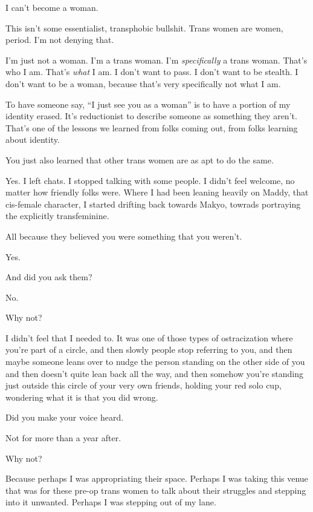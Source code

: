 \begin{paracol}{2}
\begin{leftcolumn}
I can't become a woman.

This isn't some essentialist, transphobic bullshit. Trans women are women, period. I'm not denying that.

I'm just not a woman. I'm a trans woman. I'm \emph{specifically} a trans woman. That's who I am. That's \emph{what} I am. I don't want to pass. I don't want to be stealth. I don't want to be a woman, because that's very specifically not what I am.

To have someone say, ``I just see you as a woman'' is to have a portion of my identity erased. It's reductionist to describe someone as something they aren't. That's one of the lessons we learned from folks coming out, from folks learning about identity.

\begin{ally}
You just also learned that other trans women are as apt to do the same.
\end{ally}
Yes. I left chats. I stopped talking with some people. I didn't feel welcome, no matter how friendly folks were. Where I had been leaning heavily on Maddy, that cis-female character, I started drifting back towards Makyo, towrads portraying the explicitly transfeminine.

\begin{ally}
All because they believed you were something that you weren't.
\end{ally}
Yes.

\begin{ally}
And did you ask them?
\end{ally}
No.

\begin{ally}
Why not?
\end{ally}
I didn't feel that I needed to. It was one of those types of ostracization where you're part of a circle, and then slowly people stop referring to you, and then maybe someone leans over to nudge the person standing on the other side of you and then doesn't quite lean back all the way, and then somehow you're standing just outside this circle of your very own friends, holding your red solo cup, wondering what it is that you did wrong.

\begin{ally}
Did you make your voice heard.
\end{ally}
Not for more than a year after.

\begin{ally}
Why not?
\end{ally}
Because perhaps I was appropriating their space. Perhaps I was taking this venue that was for these pre-op trans women to talk about their struggles and stepping into it unwanted. Perhaps I was stepping out of my lane.


\end{leftcolumn}
\end{paracol}
